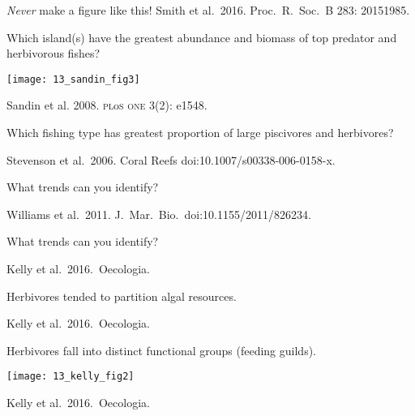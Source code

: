 \documentclass[t]{beamer}
\begin{document}
%
{
\begin{frame}[b]

	\tiny \emph{Never} make a figure like this! \hfill Smith et al.~2016. Proc.~R.~Soc.~B 283: 20151985.

\end{frame}
}
%
\begin{frame}[t]{Which island(s) have the greatest abundance and biomass of top predator and herbivorous fishes?}

	\texttt{[image: 13\_sandin\_fig3]}

	\vfilll
	
	\hfill \tiny Sandin et al. 2008. \textsc{pl}o\textsc{s one} 3(2): e1548.

\end{frame}
%
{
\begin{frame}[b]{Which fishing type has greatest proportion of large piscivores and herbivores?}

	\tiny \hfill Stevenson et al.~2006. Coral Reefs doi:10.1007/s00338-006-0158-x.

\end{frame}
}
%
%
{
\begin{frame}[b]{What trends can you identify?}

	\tiny \hfill Williams et al.~2011. J.~Mar.~Bio.~doi:10.1155/2011/826234.

\end{frame}
}
%
{
	\begin{frame}[b]{What trends can you identify?}
	
	\hfill \tiny Kelly et al.~2016.~Oecologia. %
	
\end{frame}
}
%
{
\begin{frame}[b]{Herbivores tended to partition algal resources.}
	
	\hfill \tiny Kelly et al.~2016.~Oecologia. %
	
\end{frame}
}
%
\begin{frame}[b]{Herbivores fall into distinct functional groups (feeding guilds).}

{\centering
	\texttt{[image: 13\_kelly\_fig2]}\par
}

\hfill \tiny Kelly et al.~2016.~Oecologia. %

\end{frame}
\end{document}
